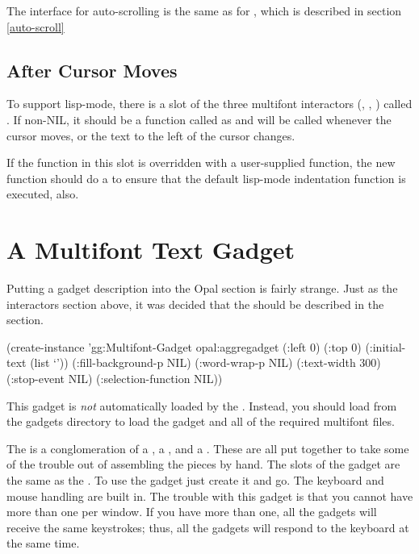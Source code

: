 The interface for auto-scrolling  is the same as for
, which is described in section \ref{auto-scroll}



\begin{group}
\section{After Cursor Moves}
To support lisp-mode, there is a slot of the three multifont
interactors (, ,
) called .  If
non-NIL, it should be a function called as 
and will be called whenever the cursor moves, or the
text to the left of the cursor changes.

If the function in this slot is overridden with a user-supplied function,
the new function should do a  to ensure
that the default lisp-mode indentation function is executed, also.
\end{group}



\section{A Multifont Text Gadget}
\label{multifontgadgetsec}

Putting a gadget description into the Opal section is fairly
strange.  Just as the interactors section above, it was decided that the
 should be described in the
 section.

\begin{programexample}

(create-instance 'gg:Multifont-Gadget opal:aggregadget
   (:left 0)
   (:top 0)
   (:initial-text (list `'))
   (:fill-background-p NIL)
   (:word-wrap-p NIL)
   (:text-width 300)
   (:stop-event NIL)
   (:selection-function NIL))
\end{programexample}

This gadget is {\it not} automatically loaded by the
.  Instead, you should load
 from the gadgets directory to load the
gadget and all of the required multifont files.

The  is a conglomeration of a ,
a , and a .
These are all put together to take some of the trouble out of assembling the
pieces by hand.  The slots of the gadget are the same as the
.  To use the gadget just create it and go.  The keyboard
and mouse handling are built in.  The trouble with this gadget is that you
cannot have more than one  per window.  If you have more
than one, all the gadgets will receive the same keystrokes; thus, all the
gadgets will respond to the keyboard at the same time.


